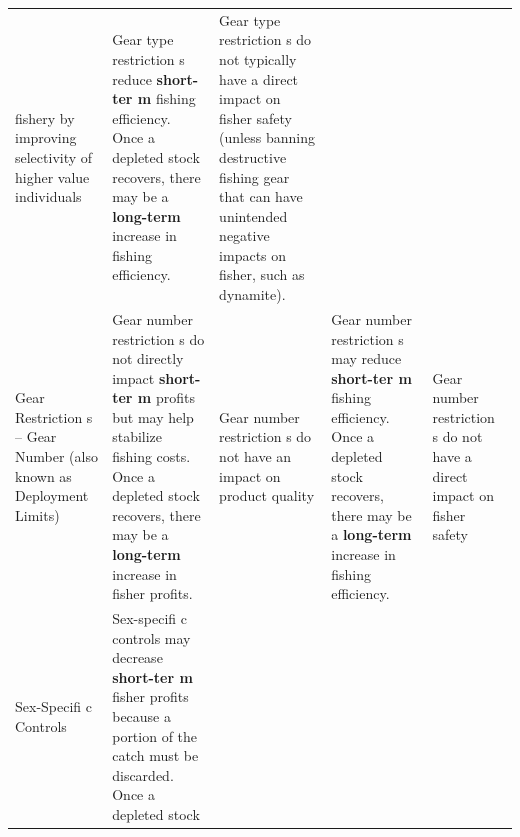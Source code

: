\documentclass[]{book}
\begin{document}
\begin{longtable}[]{@{}lllll@{}}
\begin{minipage}[t]{0.17\columnwidth}
fishery by improving selectivity of higher value individuals\strut
\end{minipage} & \begin{minipage}[t]{0.17\columnwidth}\raggedright\strut
Gear type restriction s reduce \textbf{short-ter m} fishing efficiency.
Once a depleted stock recovers, there may be a \textbf{long-term }
increase in fishing efficiency.\strut
\end{minipage} & \begin{minipage}[t]{0.17\columnwidth}\raggedright\strut
Gear type restriction s do not typically have a direct impact on fisher
safety (unless banning destructive fishing gear that can have unintended
negative impacts on fisher, such as dynamite).\strut
\end{minipage}\tabularnewline
\begin{minipage}[t]{0.17\columnwidth}\raggedright\strut
Gear Restriction s -- Gear Number (also known as Deployment
Limits)\strut
\end{minipage} & \begin{minipage}[t]{0.17\columnwidth}\raggedright\strut
Gear number restriction s do not directly impact \textbf{short-ter m}
profits but may help stabilize fishing costs. Once a depleted stock
recovers, there may be a \textbf{long-term } increase in fisher
profits.\strut
\end{minipage} & \begin{minipage}[t]{0.17\columnwidth}\raggedright\strut
Gear number restriction s do not have an impact on product quality\strut
\end{minipage} & \begin{minipage}[t]{0.17\columnwidth}\raggedright\strut
Gear number restriction s may reduce \textbf{short-ter m} fishing
efficiency. Once a depleted stock recovers, there may be a
\textbf{long-term } increase in fishing efficiency.\strut
\end{minipage} & \begin{minipage}[t]{0.17\columnwidth}\raggedright\strut
Gear number restriction s do not have a direct impact on fisher
safety\strut
\end{minipage}\tabularnewline
\begin{minipage}[t]{0.17\columnwidth}\raggedright\strut
Sex-Specifi c Controls\strut
\end{minipage} & \begin{minipage}[t]{0.17\columnwidth}\raggedright\strut
Sex-specifi c controls may decrease \textbf{short-ter m} fisher profits
because a portion of the catch must be discarded. Once a depleted stock

\end{minipage}
\end{longtable}
\end{document}
